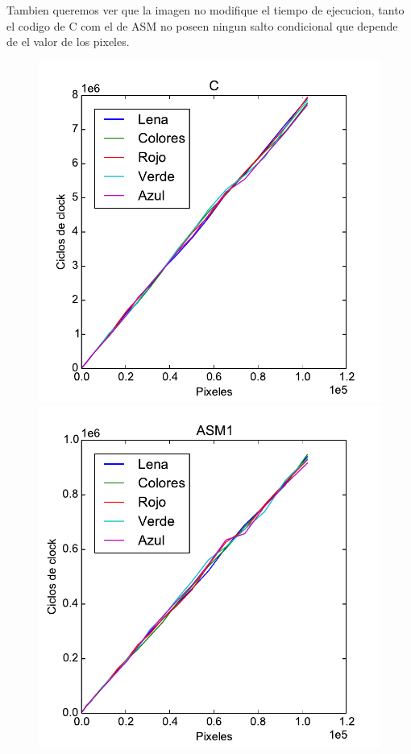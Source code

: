 Tambien queremos ver que la imagen no modifique el tiempo de ejecucion, tanto el codigo de C com el de ASM no poseen ningun salto condicional que depende de el valor de los pixeles.

\begin{figure}[h!]
	\centering
	\includegraphics[scale=0.45]{images/c_merge_lena_colors}
	\includegraphics[scale=0.45]{images/asm1_merge_lena_colors}

\end{figure}
